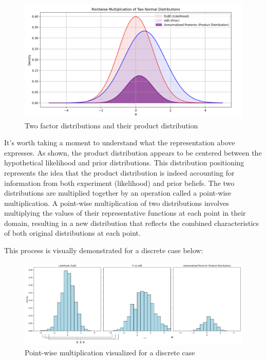 \documentclass[12pt]{article}
\begin{document}
\begin{figure}[h!]
\centering
\includegraphics[width=1.0\textwidth]{assets/visual_7.png} 
\caption{Two factor distributions and their product distribution}
\label{fig:cond_prob}
\end{figure}

\noindent It's worth taking a moment to understand what the representation above expresses. As shown, the product distribution appears to be centered between the hypothetical likelihood and prior distributions. This distribution positioning represents the idea that the product distribution is indeed accounting for information from both experiment (likelihood) and prior beliefs. The two distributions are multiplied together by an operation called a point-wise multiplication. A point-wise multiplication of two distributions involves multiplying the values of their representative functions at each point in their domain, resulting in a new distribution that reflects the combined characteristics of both original distributions at each point.

\newpage
\noindent This process is visually demonstrated for a discrete case below:

\begin{figure}[h!]
\centering
\includegraphics[width=1.0\textwidth]{assets/visual_8.png} 
\caption{Point-wise multiplication visualized for a discrete case}
\label{fig:cond_prob}
\end{figure}
\end{document}
